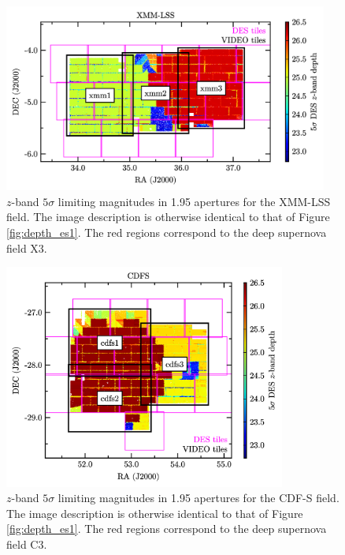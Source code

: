 \begin{figure}[!htb] 
\centering    
\includegraphics[width=0.95\textwidth]{field_outline_xmm.png}
\caption[Depths in the XMM-LSS field]{$z$-band $5\sigma$ limiting magnitudes in \SI{1.95}{\arcsec} apertures for the XMM-LSS field. The image description is otherwise identical to that of Figure \ref{fig:depth_es1}. The red regions correspond to the deep supernova field X3.}
\label{fig:depth_xmm}
\end{figure}

\begin{figure}[!htb] 
\centering    
\includegraphics[width=0.825\textwidth]{field_outline_cdfs.png}
\caption[Depths in the CDF-S field]{$z$-band $5\sigma$ limiting magnitudes in \SI{1.95}{\arcsec} apertures for the CDF-S field. The image description is otherwise identical to that of Figure \ref{fig:depth_es1}. The red regions correspond to the deep supernova field C3.}
\label{fig:depth_cdfs}
\end{figure}


